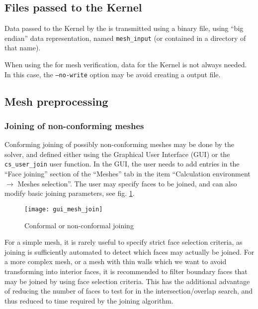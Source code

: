 {{{\subsection{Files passed to the Kernel\label{sec:pcs:mode_comm}}

Data passed to the Kernel by the \pcs is transmitted using a
binary file, using ``big endian'' data representation, named
\texttt{mesh\_input} (or contained in a directory of that name).

When using the \pcs for mesh verification, data for the Kernel
is not always needed. In this case, the \texttt{--no-write} option may be
avoid creating a \pcs output file.

\subsection{Mesh preprocessing%
\label{sec:prepro}}

\subsubsection{Joining of non-conforming meshes}\label{sec:optpcs:join}

Conforming joining of possibly non-conforming meshes may be done by the
solver, and defined either using the Graphical User Interface (GUI) or the
\texttt{cs\_user\_join} user function. In the GUI, the user needs to
add entries in the ``Face joining'' section of the ``Meshes'' tab in the item
``Calculation environment $\rightarrow$ Meshes selection''.
The user may specify faces to be joined, and can also modify basic joining
parameters, see fig. \ref{fig:joining}.
%
\begin{figure}[!h]
\begin{center}
\texttt{[image: gui\_mesh\_join]}
\caption{Conformal or non-conformal joining}
\label{fig:joining}
\end{center}
\end{figure}
%
For a simple mesh, it is rarely useful to specify strict face selection
criteria, as joining is sufficiently automated to detect which faces
may actually be joined. For a more complex mesh, or a mesh with thin
walls which we want to avoid transforming into interior faces, it is
recommended to filter boundary faces that may be joined by using
face selection criteria. This has the
additional advantage of reducing the number of faces to test for
in the intersection/overlap search, and thus reduced to time
required by the joining algorithm.

}}}
